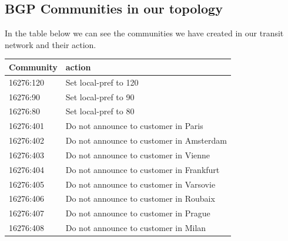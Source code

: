 \documentclass[letter, 9pt, conference]{ieeeconf}
\begin{document}
\subsection{BGP Communities in our topology}

In the table below we can see the communities we have created in our transit network and their action. 
\begin{table}[h!]
\centering
\begin{tabular}{|l|l|}
\hline
Community & action                                                                                                                         \\ \hline
16276:120 & Set local-pref to 120                                                                                                          \\
16276:90  & Set local-pref to 90                                                                                                           \\
16276:80  & Set local-pref to 80                                                                                                           \\
16276:401 & Do not announce to customer in Paris                                                                                           \\
16276:402 & Do not announce to customer in Amsterdam                                                                                       \\
16276:403 & Do not announce to customer in Vienne                                                                                          \\
16276:404 & Do not announce to customer in Frankfurt                                                                                      \\
16276:405 & Do not announce to customer in Varsovie                                                                                        \\
16276:406 & Do not announce to customer in Roubaix                                                                                         \\
16276:407 & Do not announce to customer in Prague                                                                                          \\
16276:408 & Do not announce to customer in Milan                                                                                           \\

\end{tabular}
\end{table}
\end{document}

